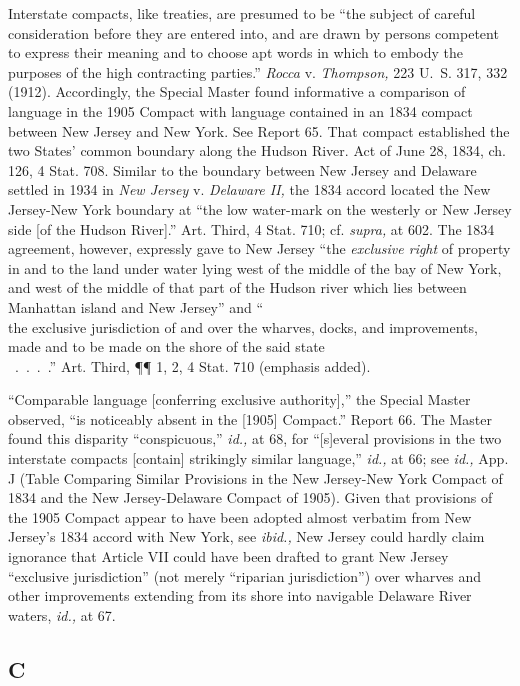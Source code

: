 {{  Interstate compacts, like treaties, are presumed to be ``the subject
of careful consideration before they are entered into, \newpage  and
are drawn by persons competent to express their meaning and to choose
apt words in which to embody the purposes of the high contracting
parties.'' \emph{Rocca} v. \emph{Thompson,} 223 U.~S. 317, 332 (1912).
Accordingly, the Special Master found informative a comparison of
language in the 1905 Compact with language contained in an 1834 compact
between New Jersey and New York. See Report 65. That compact
established the two States' common boundary along the Hudson River.
Act of June 28, 1834, ch. 126, 4 Stat. 708. Similar to the boundary
between New Jersey and Delaware settled in 1934 in \emph{New Jersey}
v. \emph{Delaware II,} the 1834 accord located the New Jersey-New York
boundary at ``the low water-mark on the westerly or New Jersey side
[of the Hudson River].'' Art. Third, 4 Stat. 710; cf. \emph{supra,}
at 602. The 1834 agreement, however, expressly gave to New Jersey
``the \emph{exclusive right} of property in and to the land under water
lying west of the middle of the bay of New York, and west of the middle
of that part of the Hudson river which lies between Manhattan island
and New Jersey'' and ``\\the exclusive jurisdiction of and over the
wharves, docks, and improvements, made and to be made on the shore of
the said state\\~.~.~.~.'' Art. Third, ¶¶ 1, 2, 4 Stat. 710
(emphasis added).

  ``Comparable language [conferring exclusive authority],''
the Special Master observed, ``is noticeably absent in the
[1905] Compact.'' Report 66. The Master found this disparity
``conspicuous,'' \emph{id.,} at 68, for ``[s]everal provisions in
the two interstate compacts [contain] strikingly similar language,''
\emph{id.,} at 66; see \emph{id.,} App. J (Table Comparing Similar
Provisions in the New Jersey-New York Compact of 1834 and the New
Jersey-Delaware Compact of 1905). Given that provisions of the
1905 Compact appear to have been adopted almost verbatim from New
Jersey's 1834 accord with New York, see \emph{ibid.,} New Jersey
could hardly claim ignorance that Article VII could have been drafted to
grant New Jersey ``exclusive jurisdiction'' (not merely ``riparian
jurisdiction'') \newpage  over wharves and other improvements extending
from its shore into navigable Delaware River waters, \emph{id.,} at
67.\footnotemark[16]

\subsection{C}

}}
